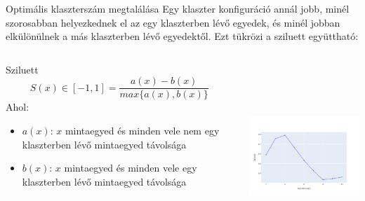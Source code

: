 \documentclass[english, aspectratio=169]{beamer}
\begin{document}
	\begin{frame}[fragile]{Optimális klaszterszám megtalálása}
		Egy klaszter konfiguráció annál jobb, minél szorosabban helyezkednek el az egy klaszterben lévő egyedek, és minél jobban elkülönülnek a más klaszterben lévő egyedektől. Ezt tükrözi a sziluett együttható:
		\begin{columns}
			\begin{column}{.5\textwidth}
				\begin{block}{Sziluett}
					\[
					S(x) \in \left[ -1, 1 \right]= \frac{a(x) - b(x)}{max\{ a(x), b(x)\}}
					\]
					Ahol:
					\begin{itemize}
						\item $a(x)$: $x$ mintaegyed és minden vele nem egy klaszterben lévő mintaegyed távolsága
						\item $b(x)$: $x$ mintaegyed és minden vele egy klaszterben lévő mintaegyed távolsága
					\end{itemize}
				\end{block}
			\end{column}
			\begin{column}{.5\textwidth}
				\begin{center}
					\includegraphics[width=7cm, height=7cm, keepaspectratio]{images/freq_15.png}
				\end{center}
			\end{column}
		\end{columns}
	\end{frame}
	
\end{document}
